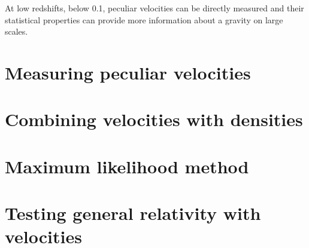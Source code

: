 \chaptertoc{}

\vspace{1em}


At low redshifts, below 0.1, peculiar velocities can be directly measured
and their statistical properties can provide more information about a
gravity on large scales. 

\section{Measuring peculiar velocities}
\label{velocities:measuring}

\section{Combining velocities with densities}

\section{Maximum likelihood method}
\label{velocities:maximum_likelihood}


\section{Testing general relativity with velocities}



